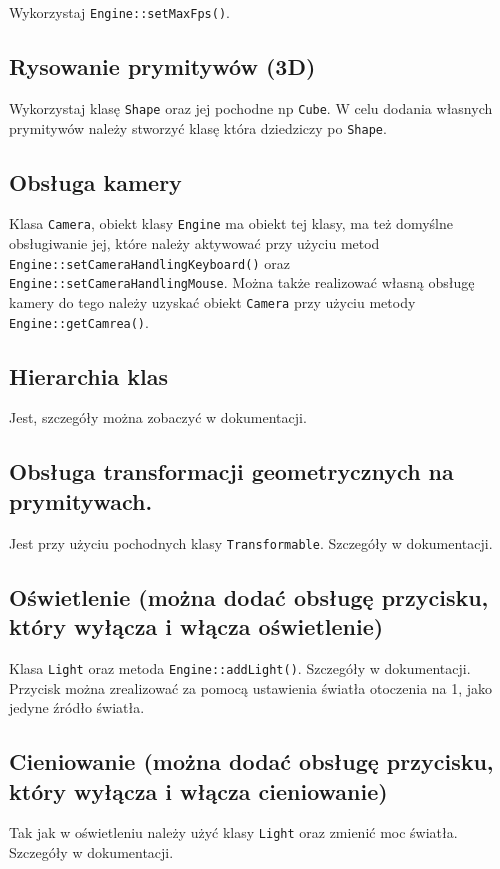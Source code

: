 \documentclass[11pt]{article}
\begin{document}
Wykorzystaj \texttt{Engine::setMaxFps()}.
\subsection{Rysowanie prymitywów (3D)}
\label{sec:org7689385}

Wykorzystaj klasę \texttt{Shape} oraz jej pochodne np \texttt{Cube}. W celu dodania własnych prymitywów należy stworzyć klasę która dziedziczy po \texttt{Shape}.
\subsection{Obsługa kamery}
\label{sec:org4b3d890}

Klasa \texttt{Camera}, obiekt klasy \texttt{Engine} ma obiekt tej klasy, ma też domyślne obsługiwanie jej, które należy aktywować przy użyciu metod
\texttt{Engine::setCameraHandlingKeyboard()} oraz \texttt{Engine::setCameraHandlingMouse}.
Można także realizować własną obsługę kamery do tego należy uzyskać obiekt \texttt{Camera} przy użyciu metody \texttt{Engine::getCamrea()}.
\subsection{Hierarchia klas}
\label{sec:org2ec57a8}
Jest, szczegóły można zobaczyć w dokumentacji.
\subsection{Obsługa transformacji geometrycznych na prymitywach.}
\label{sec:orgc90f349}

Jest przy użyciu pochodnych klasy \texttt{Transformable}. Szczegóły w dokumentacji.
\subsection{Oświetlenie (można dodać obsługę przycisku, który wyłącza i włącza oświetlenie)}
\label{sec:org7cb251d}

Klasa \texttt{Light} oraz metoda \texttt{Engine::addLight()}. Szczegóły w dokumentacji.
Przycisk można zrealizować za pomocą ustawienia światła otoczenia na 1, jako jedyne źródło światła.
\subsection{Cieniowanie (można dodać obsługę przycisku, który wyłącza i włącza cieniowanie)}
\label{sec:orgff8149c}

Tak jak w oświetleniu należy użyć klasy \texttt{Light} oraz zmienić moc światła. Szczegóły w dokumentacji.
\end{document}
